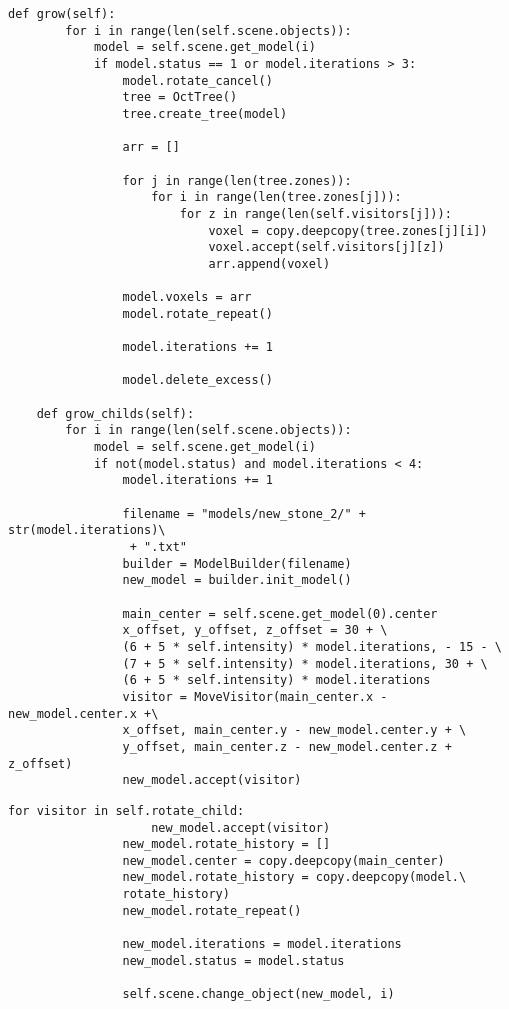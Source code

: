 \begin{lstlisting}[label=grow_alg_1,caption=Алгоритм роста тровантов(часть 1)]
    def grow(self):
        for i in range(len(self.scene.objects)):
            model = self.scene.get_model(i)
            if model.status == 1 or model.iterations > 3:
                model.rotate_cancel()
                tree = OctTree()
                tree.create_tree(model)

                arr = []

                for j in range(len(tree.zones)):
                    for i in range(len(tree.zones[j])):
                        for z in range(len(self.visitors[j])):
                            voxel = copy.deepcopy(tree.zones[j][i])
                            voxel.accept(self.visitors[j][z])
                            arr.append(voxel)

                model.voxels = arr
                model.rotate_repeat()

                model.iterations += 1

                model.delete_excess()

    def grow_childs(self):
        for i in range(len(self.scene.objects)):
            model = self.scene.get_model(i)
            if not(model.status) and model.iterations < 4:
                model.iterations += 1

                filename = "models/new_stone_2/" + str(model.iterations)\
                 + ".txt"
                builder = ModelBuilder(filename)
                new_model = builder.init_model()

                main_center = self.scene.get_model(0).center
                x_offset, y_offset, z_offset = 30 + \
                (6 + 5 * self.intensity) * model.iterations, - 15 - \
                (7 + 5 * self.intensity) * model.iterations, 30 + \
                (6 + 5 * self.intensity) * model.iterations
                visitor = MoveVisitor(main_center.x - new_model.center.x +\
                x_offset, main_center.y - new_model.center.y + \
                y_offset, main_center.z - new_model.center.z + z_offset)
                new_model.accept(visitor)
\end{lstlisting}

\begin{lstlisting}[label=grow_alg_2,caption=Алгоритм роста тровантов(часть 2)]
                for visitor in self.rotate_child:
                    new_model.accept(visitor)
                new_model.rotate_history = []
                new_model.center = copy.deepcopy(main_center)
                new_model.rotate_history = copy.deepcopy(model.\
                rotate_history)
                new_model.rotate_repeat()

                new_model.iterations = model.iterations
                new_model.status = model.status

                self.scene.change_object(new_model, i)
\end{lstlisting}

